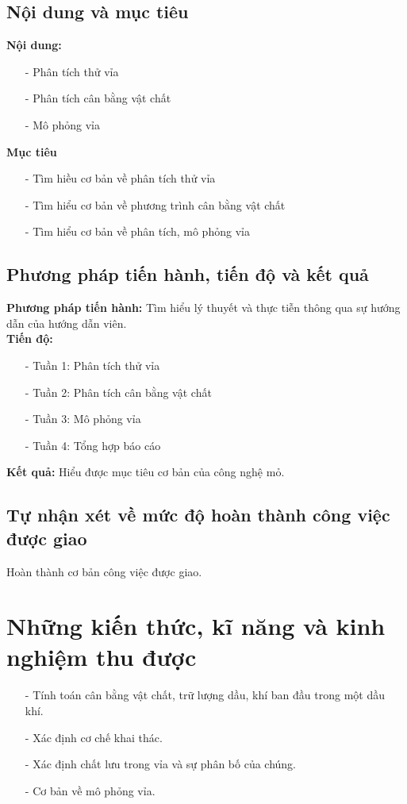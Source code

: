 \documentclass[12pt,a4paper]{report}
\begin{document}
\subsection{Nội dung và mục tiêu}
\textbf{Nội dung:}
	\begin{itemize}
    	\item[-] Phân tích thử vỉa
        \item[-] Phân tích cân bằng vật chất
        \item[-] Mô phỏng vỉa
	\end{itemize}
\textbf{Mục tiêu}
	\begin{itemize}
    	\item[-] Tìm hiều cơ bản về phân tích thử vỉa
        \item[-] Tìm hiểu cơ bản về phương trình cân bằng vật chất
        \item[-] Tìm hiểu cơ bản về phân tích, mô phỏng vỉa
    \end{itemize}
\subsection{Phương pháp tiến hành, tiến độ và kết quả}
\textbf{Phương pháp tiến hành:} Tìm hiểu lý thuyết và thực tiễn thông qua sự hướng dẫn của hướng dẫn viên.\\
\textbf{Tiến độ:}
	\begin{itemize}
    	\item[-] Tuần 1: Phân tích thử vỉa
        \item[-] Tuần 2: Phân tích cân bằng vật chất
        \item[-] Tuần 3: Mô phỏng vỉa
        \item[-] Tuần 4: Tổng hợp báo cáo
    \end{itemize}
\textbf{Kết quả:} Hiểu được mục tiêu cơ bản của công nghệ mỏ.
\subsection{Tự nhận xét về mức độ hoàn thành công việc được giao}
Hoàn thành cơ bản công việc được giao.
\section{Những kiến thức, kĩ năng và kinh nghiệm thu được}
	\begin{itemize}
    	\item[-] Tính toán cân bằng vật chất, trữ lượng dầu, khí ban đầu trong một dầu khí. 
        \item[-] Xác định cơ chế khai thác.
        \item[-] Xác định chất lưu trong vỉa và sự phân bố của chúng.
        \item[-] Cơ bản về mô phỏng vỉa.
    \end{itemize}
\end{document}

